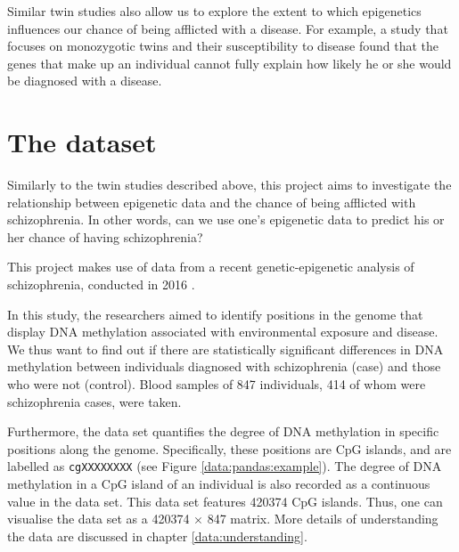 \documentclass[12pt, twoside, a4paper]{report}
\begin{document}
Similar twin studies also allow us to explore the extent to which epigenetics influences our chance of being afflicted with a disease. For example, a study \cite{RefWorks:105} that focuses on monozygotic twins and their susceptibility to disease found that the genes that make up an individual cannot fully explain how likely he or she would be diagnosed with a disease.

\section{The dataset} \label{bg_genetic_data}

Similarly to the twin studies described above, this project aims to investigate the relationship between epigenetic data and the chance of being afflicted with schizophrenia. In other words, can we use one's epigenetic data to predict his or her chance of having schizophrenia?

This project makes use of data from a recent genetic-epigenetic analysis of schizophrenia, conducted in 2016 \cite{RefWorks:78}.


In this study, the researchers aimed to identify positions in the genome that display DNA methylation associated with environmental exposure and disease. We thus want to find out if there are statistically significant differences in DNA methylation between individuals diagnosed with schizophrenia (case) and those who were not (control). Blood samples of 847 individuals, 414 of whom were schizophrenia cases, were taken.

Furthermore, the data set quantifies the degree of DNA methylation in specific positions along the genome. Specifically, these positions are CpG islands, and are labelled as \texttt{cgXXXXXXXX} (see Figure \ref{data:pandas:example}). The degree of DNA methylation in a CpG island of an individual is also recorded as a continuous value in the data set. This data set features 420374 CpG islands. Thus, one can visualise the data set as a 420374 $\times$ 847 matrix. More details of understanding the data are discussed in chapter \ref{data:understanding}.

\end{document}
